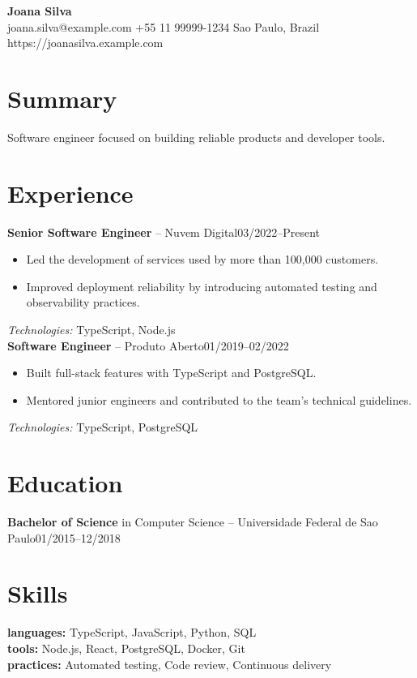 \documentclass[11pt]{article}
\begin{document}
\begin{center}
{\LARGE \textbf{ Joana Silva }}\\
joana.silva@example.com \textbar{} +55 11 99999-1234 \textbar{} Sao Paulo, Brazil \textbar{} https://joanasilva.example.com
\end{center}
\section*{Summary}
Software engineer focused on building reliable products and developer tools.
\section*{Experience}
\textbf{ Senior Software Engineer } -- Nuvem Digital\hfill 03/2022--Present\\
\begin{itemize}
  \item Led the development of services used by more than 100,000 customers.
  \item Improved deployment reliability by introducing automated testing and observability practices.
\end{itemize}
\emph{Technologies:} TypeScript, Node.js\\
\textbf{ Software Engineer } -- Produto Aberto\hfill 01/2019--02/2022\\
\begin{itemize}
  \item Built full-stack features with TypeScript and PostgreSQL.
  \item Mentored junior engineers and contributed to the team's technical guidelines.
\end{itemize}
\emph{Technologies:} TypeScript, PostgreSQL\\
\section*{Education}
\textbf{ Bachelor of Science } in Computer Science -- Universidade Federal de Sao Paulo\hfill 01/2015--12/2018\\
\section*{Skills}
\textbf{ languages:} TypeScript, JavaScript, Python, SQL\\
\textbf{ tools:} Node.js, React, PostgreSQL, Docker, Git\\
\textbf{ practices:} Automated testing, Code review, Continuous delivery\\
\end{document}
